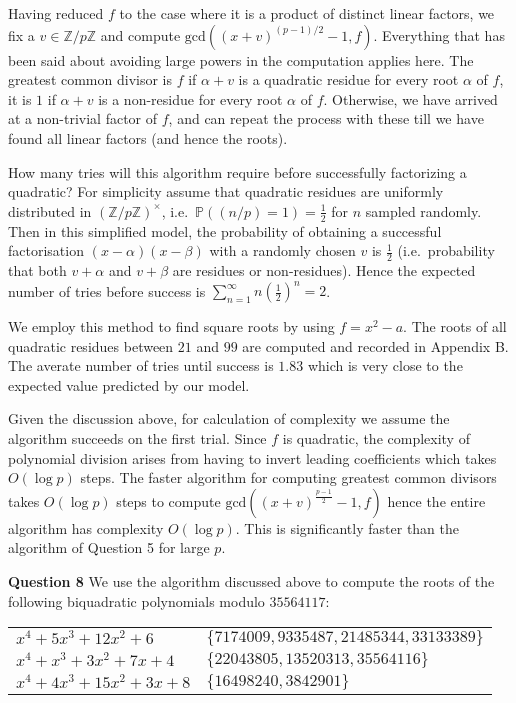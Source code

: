 \documentclass[12pt]{article}
\begin{document}
Having reduced \(f\) to the case where it is a product of distinct linear
factors, we fix a \(v \in \mathbb{Z}/p\mathbb{Z}\) and compute
\(\text{gcd}((x+v)^{(p-1)/2}-1, f)\). Everything that has been said about
avoiding large powers in the computation applies here. The greatest common
divisor is \(f\) if \(\alpha+v\) is a quadratic residue for every root
\(\alpha\) of \(f\), it is \(1\) if \(\alpha+v\) is a non-residue for every root
\(\alpha\) of \(f\). Otherwise, we have arrived at a non-trivial factor
of \(f\), and can repeat the process with these till we have found all
linear factors (and hence the roots).

How many tries will this algorithm require before successfully factorizing a
quadratic? For simplicity assume that quadratic residues are uniformly
distributed in
\((\mathbb{Z}/p\mathbb{Z})^\times\), i.e.\ \(\mathbb{P}((n/p)=1)=\frac{1}{2}\)
for \(n\) sampled randomly. Then in this simplified model, the
probability of obtaining a successful factorisation \((x-\alpha)(x-\beta)\)
with a randomly chosen \(v\) is \(\frac{1}{2}\) (i.e.\ probability that both \(v+\alpha\) and \(v+\beta\) are residues or non-residues). Hence the expected number of tries before success is \(\sum_{n=1}^\infty n (\frac{1}{2})^n=2\).

We employ this method to find square roots by using \(f=x^2-a\). The
roots of all quadratic residues between \(21\) and \(99\) are computed
and recorded in Appendix B. The averate number of tries until success
is \(1.83\) which is very close to the expected value predicted by our model.

Given the discussion above, for calculation of complexity we assume the
algorithm succeeds on the first trial. Since \(f\) is quadratic, the complexity
of polynomial division arises from having to invert leading coefficients which
takes \(O(\log p)\) steps. The faster algorithm for computing greatest common
divisors takes \(O(\log p)\) steps to compute
\(\text{gcd}((x+v)^\frac{p-1}{2}-1, f)\) hence the entire algorithm has
complexity \(O(\log p)\). This is significantly faster than
the algorithm of Question 5 for large \(p\).

\textbf{Question 8} \quad We use the algorithm discussed above to compute the
roots of the following biquadratic polynomials modulo \(35564117\):

\begin{tabular}{ll}
    \(x^4 + 5x^3 + 12x^2 + 6\) &\(\{7174009, 9335487, 21485344, 33133389\}\)\\
    \(x^4 + x^3 + 3x^2 + 7x + 4\) &\(\{22043805, 13520313, 35564116\}\)\\
    \(x^4 + 4x^3 + 15x^2 + 3x + 8\) &\(\{16498240, 3842901\}\)
\end{tabular}
\end{document}
